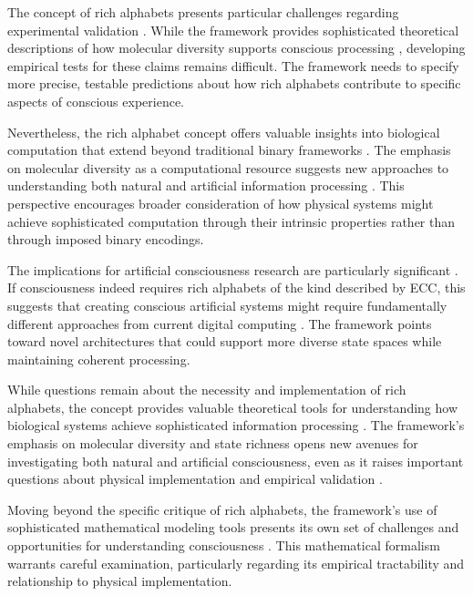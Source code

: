 The concept of rich alphabets presents particular challenges regarding experimental validation \cite{pigliucci2013philosophy}. While the framework provides sophisticated theoretical descriptions of how molecular diversity supports conscious processing \cite{block2009comparing}, developing empirical tests for these claims remains difficult. The framework needs to specify more precise, testable predictions about how rich alphabets contribute to specific aspects of conscious experience.

Nevertheless, the rich alphabet concept offers valuable insights into biological computation that extend beyond traditional binary frameworks \cite{noe2009out}. The emphasis on molecular diversity as a computational resource suggests new approaches to understanding both natural and artificial information processing \cite{koch2019feeling}. This perspective encourages broader consideration of how physical systems might achieve sophisticated computation through their intrinsic properties rather than through imposed binary encodings.

The implications for artificial consciousness research are particularly significant \cite{chalmers2010character}. If consciousness indeed requires rich alphabets of the kind described by ECC, this suggests that creating conscious artificial systems might require fundamentally different approaches from current digital computing \cite{seth2021being}. The framework points toward novel architectures that could support more diverse state spaces while maintaining coherent processing.

While questions remain about the necessity and implementation of rich alphabets, the concept provides valuable theoretical tools for understanding how biological systems achieve sophisticated information processing \cite{goff2019galileo}. The framework's emphasis on molecular diversity and state richness opens new avenues for investigating both natural and artificial consciousness, even as it raises important questions about physical implementation and empirical validation \cite{thompson2014waking}.

Moving beyond the specific critique of rich alphabets, the framework's use of sophisticated mathematical modeling tools presents its own set of challenges and opportunities for understanding consciousness \cite{dennett2017bacteria}. This mathematical formalism warrants careful examination, particularly regarding its empirical tractability and relationship to physical implementation.

